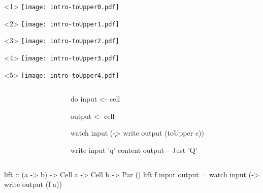 \documentclass[UKenglish,usenames,dvipsnames,svgnames,table,aspectratio=169,mathserif]{beamer}
\newcommand{\nl}{\vspace{\baselineskip}}
\newcommand{\pnl}{\pause \nl}
\begin{document}
\begin{frame}[fragile]
\centering

\begin{overlayarea}{0.5\textwidth}{0.4\textheight}
\begin{onlyenv}<1>
\texttt{[image: intro-toUpper0.pdf]}
\end{onlyenv}
\begin{onlyenv}<2>
\texttt{[image: intro-toUpper1.pdf]}
\end{onlyenv}
\begin{onlyenv}<3>
\texttt{[image: intro-toUpper2.pdf]}
\end{onlyenv}
\begin{onlyenv}<4>
\texttt{[image: intro-toUpper3.pdf]}
\end{onlyenv}
\begin{onlyenv}<5>
\texttt{[image: intro-toUpper4.pdf]}
\end{onlyenv}
\end{overlayarea}

\begin{columns}
\begin{column}{0.3\textwidth}
\end{column}
\begin{column}{0.7\textwidth}
\begin{haskellcode}
do
  input  <- cell
\end{haskellcode}
\pause
\begin{haskellcode}
  output <- cell
\end{haskellcode}
\pause
\begin{haskellcode}
  watch input (\c ->
    write output (toUpper c))
\end{haskellcode}
\pnl
\begin{haskellcode}
  write input 'q'
  content output   -- Just 'Q'
\end{haskellcode}
\end{column}
\end{columns}
\end{frame}


\begin{frame}[fragile]
\begin{haskellcode}
          lift :: (a -> b) -> Cell a -> Cell b -> Par ()
          lift f input output =
            watch input (\a ->
              write output (f a))
\end{haskellcode}
\end{frame}
\end{document}
